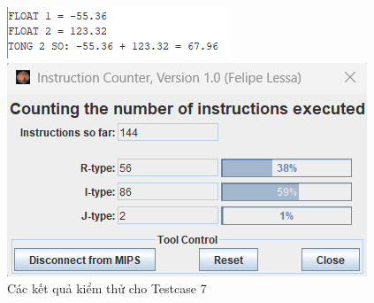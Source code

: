 \begin{figure}[!h]
    \centering
    \begin{minipage}[b]{0.48\textwidth}
        \centering
        \includegraphics[width=\textwidth]{image/TESTCASE/Testcase 7.png}
    \end{minipage}
    \hfill
    \begin{minipage}[b]{0.48\textwidth}
        \centering
        \includegraphics[width=\textwidth]{image/TESTCASE/Instruction Counter 7.png}
    \end{minipage}
    \vspace{0.5cm}
    \caption{Các kết quả kiểm thử cho Testcase 7}
\end{figure}

\vspace{0.5 cm}

